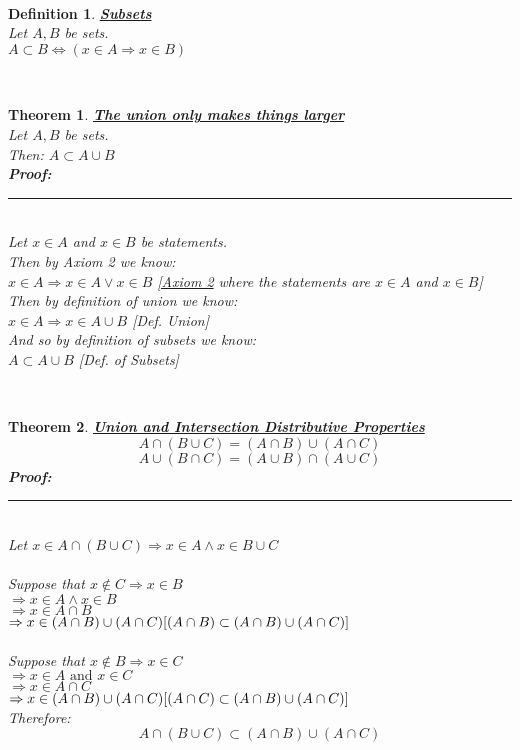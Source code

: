 \documentclass[12pt]{extarticle}
\theoremstyle{plain}
\newtheorem{thm}{Theorem}[section]
\theoremstyle{plain}
\theoremstyle{plain}
\theoremstyle{Definition}
\newtheorem{def.}{Definition}[section]
\theoremstyle{Definition}
\theoremstyle{plain}
\theoremstyle{plain}
\newcommand{\cut}[0]{\noindent\framebox[\linewidth]{\rule{\linewidth}{2pt}}\\}
\newcommand{\prof}[0]{	\noindent \textbf{Proof:} \rule{500pt}{2pt} \\ }
\begin{document}
\cut
\begin{def.} \underline{\textbf{Subsets}} \\ 
	Let $A,B$ be sets. \\ 
	$A \subset B \Leftrightarrow (x \in A \Rightarrow x \in B)$
\end{def.}
\cut
\begin{thm} \underline{\textbf{The union only makes things larger}} \\
	Let $A,B$ be sets. \\ 
	Then: $A \subset A \cup B$ \\ 
	\prof 
	Let $x \in A$ and $x\in B$ be statements. \\
	Then by Axiom 2 we know: \\ 
	$x \in A \Rightarrow x \in A \lor x \in B$  \hfill \hyperlink{Axioms}{[Axiom 2} where the statements are $x \in A$ and $x \in B$] \\ 
	Then by definition of union we know: \\ 
	$x \in A \Rightarrow x \in A \cup B$ \hfill [Def. Union] \\
	And so by definition of subsets we know: \\ 
	$A \subset A \cup B$ \hfill [Def. of Subsets] \\
\end{thm}
\cut
\begin{thm} \underline{\textbf{Union and Intersection Distributive Properties}} \\ 
	$$A \cap (B \cup C) = (A \cap B) \cup (A \cap C)$$ 	
	$$A \cup (B \cap C) = (A \cup B) \cap (A \cup C)$$
	\prof
	Let $x \in A \cap (B \cup C) \Rightarrow x \in A \land x \in B \cup C$ \\ \\
	Suppose that $x \not \in C \Rightarrow x \in B$ \\ 
	$\Rightarrow x \in A \land x \in B$ \\ 
	$\Rightarrow x \in A \cap B$ \\ 
	$\Rightarrow x \in (A \cap B) \cup (A \cap C) \hfill [(A \cap B) \subset (A \cap B) \cup (A \cap C)]$ \\ \\
	Suppose that $x \not \in B \Rightarrow x \in C$ \\ 
	$\Rightarrow x \in A \text{ and } x \in C$ \\ 
	$\Rightarrow x \in A \cap C$ \\ 
	$\Rightarrow x \in (A \cap B) \cup (A \cap C) \hfill [(A \cap C) \subset (A \cap B) \cup (A \cap C)]$ \\
	Therefore: \\ 
	$$A \cap (B \cup C) \subset (A \cap B) \cup (A \cap C)$$ 	
\end{thm}
\end{document}
